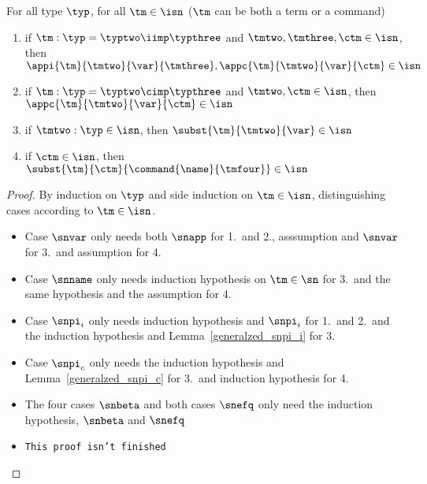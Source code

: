 \begin{lemma}
  For all type $\typ$, for all $\tm\in\isn$ ($\tm$ can be both a term or a command)
  \begin{enumerate}
  \item if $\tm:\typ=\typtwo\iimp\typthree$ and $\tmtwo, \tmthree, \ctm\in\isn$, then $\appi{\tm}{\tmtwo}{\var}{\tmthree}, \appc{\tm}{\tmtwo}{\var}{\ctm}\in\isn$
  \item if $\tm:\typ=\typtwo\cimp\typthree$ and $\tmtwo, \ctm\in\isn$, then $\appc{\tm}{\tmtwo}{\var}{\ctm}\in\isn$
  \item if $\tmtwo:\typ\in\isn$, then $\subst{\tm}{\tmtwo}{\var}\in\isn$
  \item if $\ctm\in\isn$, then $\subst{\tm}{\ctm}{\command{\name}{\tmfour}}\in\isn$
  \end{enumerate}
\end{lemma}
\begin{proof}
  By induction on $\typ$ and side induction on $\tm\in\isn$, distinguishing cases according to $\tm\in\isn$.
  \begin{itemize}
  \item Case $\snvar$ only needs both $\snapp$ for 1.\ and 2., asssumption and $\snvar$ for 3.\ and assumption for 4.
  \item Case $\snname$ only needs induction hypothesis on $\tm\in\sn$ for 3.\ and the same hypothesis and the assumption for 4.
  \item Case $\snpi_i$ only needs induction hypothesis and $\snpi_i$ for 1.\ and 2.\ and the induction hypothesis and Lemma~\ref{generalzed_snpi_i} for 3.
  \item Case $\snpi_c$ only needs the induction hypothesis and Lemma~\ref{generalzed_snpi_c} for 3.\ and induction hypothesis for 4.
  \item The four cases $\snbeta$ and both cases $\snefq$ only need the induction hypothesis, $\snbeta$ and $\snefq$
  \item \texttt{This proof isn't finished}
  \end{itemize}
\end{proof}
